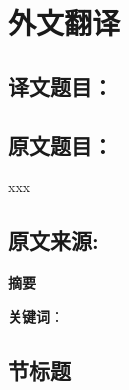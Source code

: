 \cleardoublepage

\newrefsection

\chapter{外文翻译}
\section*{译文题目：}

\section*{原文题目：}
xxx\cite{abc}
\section*{原文来源:}
\begingroup
    \printbibliography[heading=none,keyword={abc}]
\endgroup

\textbf{摘要}

\textbf{关键词}：

\section{节标题}




\begingroup
    \printbibliography[title={参考文献}]
\endgroup
